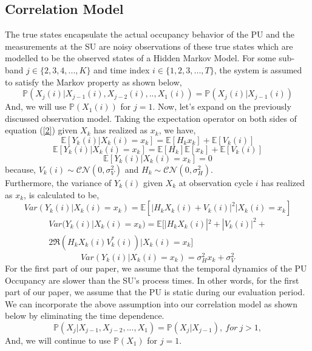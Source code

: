 \documentclass[conference]{IEEEtran}
\begin{document}
\subsection{Correlation Model}
The true states encapsulate the actual occupancy behavior of the PU and the measurements at the SU are noisy observations of these true states which are modelled to be the observed states of a Hidden Markov Model.
For some sub-band $j\in\{2,3,4,...,K\}$ and time index $i\in\{1,2,3,...,T\}$, the system is assumed to satisfy the Markov property as shown below,
\[\mathbb P(X_{j}(i)|X_{j-1}(i),X_{j-2}(i),..,X_1(i))=\mathbb P(X_{j}(i)|X_{j-1}(i))\]
And, we will use $\mathbb P(X_1(i))$ for $j=1$. 
Now, let's expand on the previously discussed observation model.
Taking the expectation operator on both sides of equation (\ref{2}) given $X_k$ has realized as $x_k$, we have,
\[\mathbb E[Y_k(i)|X_k(i)=x_k]=\mathbb E[H_kx_k]+\mathbb E[V_k(i)]\]
\[\mathbb E[Y_k(i)|X_k(i)=x_k]=\mathbb E[H_k]\mathbb E[x_k]+\mathbb E[V_k(i)]\]
\begin{equation}\label{4}
    \mathbb E[Y_k(i)|X_k(i)=x_k]=0
\end{equation}
because, $V_k(i)\sim\mathcal{CN}(0,\sigma_V^2)$ and $H_k\sim\mathcal{CN}(0,\sigma_H^2)$. 
\\Furthermore, the variance of $Y_k(i)$ given $X_k$ at observation cycle $i$ has realized as $x_k$, is calculated to be, 
\begin{equation*}
    Var(Y_k(i)|X_k(i)=x_k)=\mathbb E[|H_kX_k(i)+V_k(i)|^2|X_k(i)=x_k]
\end{equation*}
\begin{equation*}
    \begin{aligned}
        Var(Y_k(i)|X_k(i)=x_k)=\mathbb E[|H_kX_k(i)|^2+|V_k(i)|^2+\\2\Re(H_kX_k(i)V_k^*(i))|X_k(i)=x_k]
    \end{aligned}
\end{equation*}
\begin{equation}\label{5}
    Var(Y_k(i)|X_k(i)=x_k)=\sigma_H^2x_k+\sigma_V^2
\end{equation}
For the first part of our paper, we assume that the temporal dynamics of the PU Occupancy are slower than the SU's process times. In other words, for the first part of our paper, we assume that the PU is static during our evaluation period. We can incorporate the above assumption into our correlation model as shown below by eliminating the time dependence.
\[\mathbb P(X_{j}|X_{j-1},X_{j-2},...,X_1)=\mathbb P(X_{j}|X_{j-1}),\ for\ j>1,\]
And, we will continue to use $\mathbb P(X_1)$ for $j=1$.
\end{document}
